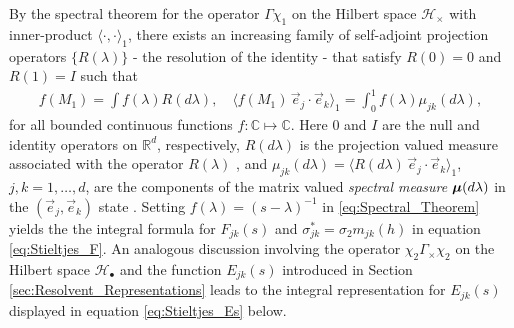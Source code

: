 \documentclass{cmslatex}
\newcommand\bmu{\mbox{\boldmath${\mu}$}}
\begin{document}
By the spectral theorem \cite{Reed-1980,Stone:64} for the operator
$\Gamma\chi_1$ on the Hilbert space $\mathscr{H}_\times$ with inner-product
$\langle\cdot,\cdot\rangle_1$, there exists an increasing family of self-adjoint
projection operators $\{R(\lambda)\}$ - the resolution of the identity - that
satisfy $R(0)=0$ and $R(1)=I$ such that    
%
\begin{align}\label{eq:Spectral_Theorem}
  f(M_1)=\int f(\lambda)R(d\lambda), \quad
  \langle f(M_1)\,\vec{e}_j\cdot\vec{e}_k\rangle_1= \int_0^1f(\lambda)\mu_{jk}(d\lambda), 
\end{align}
%
for all bounded continuous functions $f:\mathbb{C}\mapsto\mathbb{C}$. Here
$0$ and $I$ are the null and identity operators on $\mathbb{R}^d$,
respectively, $R(d\lambda)$ is the projection valued measure associated with
the operator $R(\lambda)$ \cite{Reed-1980}, and
$\mu_{jk}(d\lambda)=\langle R(d\lambda)\,\vec{e}_j\cdot\vec{e}_k\rangle_1$, $j,k=1,\ldots,d$, are the
components of the matrix valued \emph{spectral measure} $\bmu(d\lambda)$ in
the $(\vec{e}_j,\vec{e}_k)$ state
\cite{Golden:CMP-473,Reed-1980,Stone:64}.
Setting $f(\lambda)=(s-\lambda)^{-1}$ in \eqref{eq:Spectral_Theorem} yields the
the integral formula for $F_{jk}(s)$ and $\sigma_{jk}^*=\sigma_2m_{jk}(h)$ in
equation \eqref{eq:Stieltjes_F}. An analogous discussion involving the
operator $\chi_2\Gamma_\times\chi_2$ on the Hilbert space
$\mathscr{H}_{\bullet}$ and the function $E_{jk}(s)$ introduced in Section 
\ref{sec:Resolvent_Representations} leads to the integral
representation for $E_{jk}(s)$ displayed in equation
\eqref{eq:Stieltjes_Es} below.  
\end{document}
